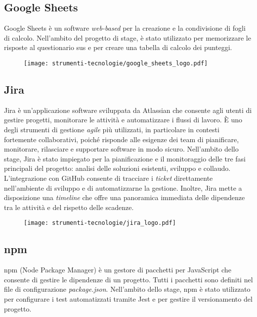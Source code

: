 \subsection*{Google Sheets}

\par Google Sheets è un software \textit{web-based} per la creazione e la condivisione di fogli di calcolo. Nell’ambito del progetto di stage, è stato utilizzato per memorizzare le risposte al questionario \gls{sus} e per creare una tabella di calcolo dei punteggi.

\begin{figure}[H]
    \centering 
    \texttt{[image: strumenti-tecnologie/google\_sheets\_logo.pdf]} 
\end{figure}

\subsection*{Jira}

\par Jira è un'applicazione software sviluppata da Atlassian che consente agli utenti di gestire progetti, monitorare le attività e automatizzare i flussi di lavoro. È uno degli strumenti di gestione \textit{agile} più utilizzati, in particolare in contesti fortemente collaborativi, poiché risponde alle esigenze dei team di pianificare, monitorare, rilasciare e supportare software in modo sicuro. Nell’ambito dello stage, Jira è stato impiegato per la pianificazione e il monitoraggio delle tre fasi principali del progetto: analisi delle soluzioni esistenti, sviluppo e collaudo. L’integrazione con GitHub consente di tracciare i \textit{ticket} direttamente nell’ambiente di sviluppo e di automatizzarne la gestione. Inoltre, Jira mette a disposizione una \textit{timeline} che offre una panoramica immediata delle dipendenze tra le attività e del rispetto delle scadenze.

\begin{figure}[H]
    \centering 
    \texttt{[image: strumenti-tecnologie/jira\_logo.pdf]} 
\end{figure}

\subsection*{npm}

\par npm (Node Package Manager) è un gestore di pacchetti per JavaScript che consente di gestire le dipendenze di un progetto. Tutti i pacchetti sono definiti nel file di configurazione \textit{package.json}. Nell’ambito dello stage, npm è stato utilizzato per configurare i test automatizzati tramite Jest e per gestire il versionamento del progetto.

